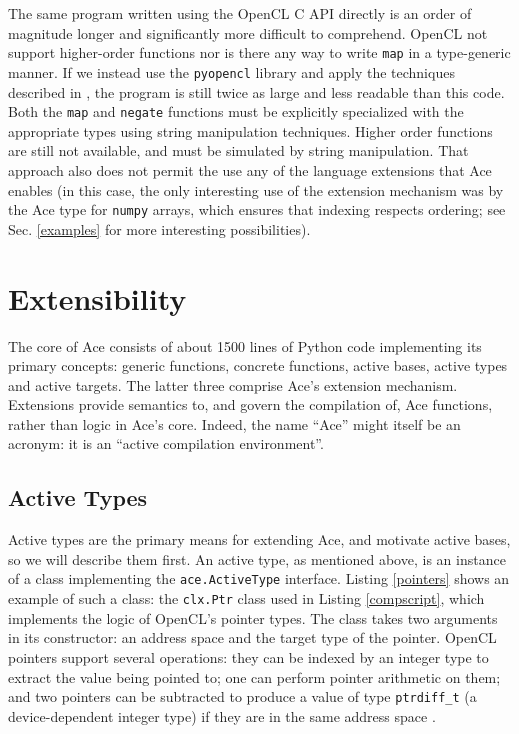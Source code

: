 \documentclass[9pt,preprint]{sigplanconf}
\begin{document}
The same program written using the OpenCL C API directly is an order of magnitude longer and significantly more difficult to comprehend. OpenCL not support higher-order functions nor is there any way to write \verb|map| in a type-generic manner. If we instead use the \verb|pyopencl| library and apply the techniques described in \cite{klockner2011pycuda}, the program is still twice as large and less readable than this code. Both the \verb|map| and \verb|negate| functions must be explicitly specialized with the appropriate types using string manipulation techniques. Higher order functions are still not available, and must be simulated by string manipulation. That approach also does not permit the use any of the language extensions that Ace enables (in this case, the only interesting use of the extension mechanism was by the Ace type for \verb|numpy| arrays, which ensures that indexing respects ordering; see Sec. \ref{examples} for more interesting possibilities).


\section{Extensibility}\label{att}
The core of Ace consists of about 1500 lines of Python code implementing its primary concepts: generic functions, concrete functions, active bases, active types and active targets.  The latter three comprise Ace's extension mechanism. Extensions provide semantics to, and govern the compilation of, Ace functions, rather than logic in Ace's core. Indeed, the name ``Ace'' might itself be an acronym: it is an ``active compilation environment''.

\subsection{Active Types}\label{atypes}
Active types are the primary means for extending Ace, and motivate active bases, so we will describe them first. An active type, as mentioned above, is an instance of a class implementing the \verb|ace.ActiveType| interface. Listing \ref{pointers} shows an example of such a class: the \verb|clx.Ptr| class used in Listing \ref{compscript}, which implements the logic of OpenCL's pointer types. The class takes two arguments in its constructor: an address space and the target type of the pointer.
OpenCL pointers support several operations: they can be indexed by an integer type to extract the value being pointed to; one can perform pointer arithmetic on them; and two pointers can be subtracted to produce a value of type \verb|ptrdiff_t| (a device-dependent integer type) if they are in the same address space \cite{opencl11}.
\end{document}
